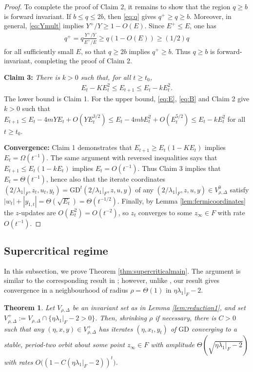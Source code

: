 \documentclass{article}
\newcommand{\GD}{\mathrm{GD}}
\theoremstyle{plain}
\newtheorem{theorem}{Theorem}[section]
\theoremstyle{definition}
\theoremstyle{remark}
\begin{document}
\begin{proof}
To complete the proof of Claim 2, it remains to show that the region $q\ge b$ is forward invariant. If $b\le q\le 2b$, then \eqref{eq:q} gives $q^+\ge q\ge b$. Moreover, in general, \eqref{eq:Ymult} implies $Y^+/Y\ge 1-O(E)$. Since $E^+\le E$, one has
\begin{align}
q^+ = q\frac{Y^+/Y}{E^+/E}\ge q(1 -O(E))\ge (1/2)q
\end{align}
for all sufficiently small $E$, so that $q\ge 2b$ implies $q^+\ge b$. Thus $q\ge b$ is forward-invariant, completing the proof of Claim 2.

\noindent\textbf{Claim 3:} \emph{There is $k>0$ such that, for all $t\ge t_0$,
\begin{align}
E_t-KE_t^2\leq E_{t+1}\leq E_t-kE_t^2.
\end{align}}
The lower bound is Claim 1. For the upper bound, \eqref{eq:E}, \eqref{eq:B} and Claim 2 give $k>0$ such that $E_{t+1}\leq E_t-4mYE_t + O(YE_t^{3/2})\leq E_t-4mbE_t^2 + O(E_t^{5/2})\leq E_t-kE_t^2$ for all $t\geq t_0$.

\textbf{Convergence: } Claim 1 demonstrates that $E_{t+1}\geq E_t(1-KE_t)$ implies $E_t = \Omega(t^{-1})$. The same argument with reversed inequalities says that $E_{t+1}\leq E_t(1-kE_t)$ implies $E_t = O(t^{-1})$. Thus Claim 3 implies that $E_t = \Theta(t^{-1})$, hence also that the iterate coordinates $(2/\lambda_1|_F,z_t,u_t,y_t) = \GD^t(2/\lambda_1|_F,z,u,y)$ of any $(2/\lambda_1|_F,z,u,y)\in V^0_{\rho,\Delta}$ satisfy $|w_t|+|y_{1,t}| = \Theta(\sqrt{E_t}) = \Theta(t^{-1/2})$. Finally, by Lemma \ref{lem:fermicoordinates} the $z$-updates are $O(E_t^2) = O(t^{-2})$, so $z_t$ converges to some $z_{\infty}\in F$ with rate $O(t^{-1})$.
\end{proof}

\subsection{Supercritical regime}\label{subsec:supercriticalappendix}

In this subsection, we prove Theorem \ref{thm:supercriticalmain}. The argument is similar to the corresponding result in \cite{macdonaldeos}; however, unlike \cite{macdonaldeos}, our result gives convergence in a neighbourhood of radius $\rho = \Theta(1)$ in $\eta\lambda_1|_F-2$.

\begin{theorem}\label{thm:supercriticalappendix}
    Let $V_{\rho,\Delta}$ be an invariant set as in Lemma \ref{lem:reduction1}, and set $V^+_{\rho,\Delta}:=V_{\rho,\Delta}\cap\{\eta\lambda_1|_F-2>0\}$. Then, shrinking $\rho$ if necessary, there is $C>0$ such that any $(\eta,x,y)\in V^+_{\rho,\Delta}$ has iterates $(\eta,x_t,y_t)$ of $\GD$ converging to a stable, period-two orbit about some point $z_{\infty}\in F$ with amplitude $\Theta(\sqrt{\eta\lambda_1|_{F}-2})$ with rates $O\big((1-C(\eta\lambda_1|_F-2))^t\big)$.
\end{theorem}
\end{document}
